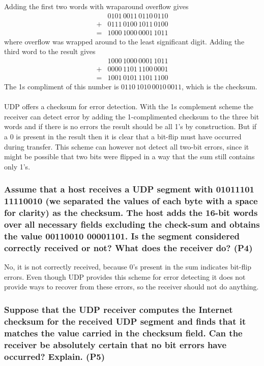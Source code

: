 Adding the first two words with wraparound overflow gives
\begin{equation*}
\begin{split}
    &0101 \, 0011 \, 0110 \, 0110 \\
    + &0111 \, 0100 \, 1011 \, 0100\\
    =  &1000 \, 1000 \, 0001 \, 1011
\end{split}
\end{equation*}
where overflow was wrapped around to the least significant digit. Adding the third word to the result gives
\begin{equation*}
\begin{split}
    &1000 \, 1000 \, 0001 \, 1011 \\
    + &0000 \, 1101 \, 1100 \, 0001 \\
    = & 1001 \, 0101 \, 1101 \, 1100
\end{split}
\end{equation*}
The 1s compliment of this number is $0110 \, 1010 \, 0010 \, 0011$, which is the checksum. \\
\\
UDP offers a checksum for error detection. With the 1s complement scheme the receiver can detect error by adding the 1-complimented checksum to the three bit words and if there is no errors the result should be all 1's by construction. But if a 0 is present in the result then it is clear that a bit-flip must have occurred during transfer. This scheme can however not detect all two-bit errors, since it might be possible that two bits were flipped in a way that the sum still contains only 1's.


\subsubsection{Assume that a host receives a UDP segment with 01011101 11110010 (we separated the values of each byte with a space for clarity) as the checksum. The host adds the 16-bit words over all necessary fields excluding the check-sum and obtains the value 00110010 00001101. Is the segment considered correctly received or not? What does the receiver do? (P4)}

No, it is not correctly received, because 0's present in the sum indicates bit-flip errors. Even though UDP provides this scheme for error detecting it does not provide ways to recover from these errors, so the receiver should not do anything.


\subsubsection{Suppose that the UDP receiver computes the Internet checksum for the received UDP segment and finds that it matches the value carried in the checksum field. Can the receiver be absolutely certain that no bit errors have occurred? Explain. (P5)}

